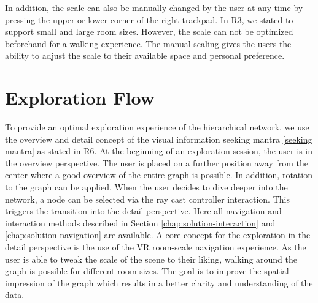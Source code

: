 In addition, the scale can also be manually changed by the user at any time by pressing the upper or lower corner of the right trackpad. 
In \hyperref[req:R3]{R3}, we stated to support small and large room sizes.  However, the scale can not be optimized beforehand for a walking experience. The manual scaling gives the users the ability to adjust the scale to their available space and personal preference.
\section{Exploration Flow}
\label{chap:ps-explorationFlow}
To provide an optimal exploration experience of the hierarchical network, we use the overview and detail concept of the visual information seeking mantra \ref{seeking mantra} as stated in \hyperref[req:R6]{R6}. 
At the beginning of an exploration session, the user is in the overview perspective. The user is placed on a further position away from the center where a good overview of the entire graph is possible. In addition, rotation to the graph can be applied.
When the user decides to dive deeper into the network, a node can be selected via the ray cast controller interaction. This triggers the transition into the detail perspective. 
Here all navigation and interaction methods described in Section \ref{chap:solution-interaction} and \ref{chap:solution-navigation}
are available. 
A core concept for the exploration in the detail perspective is the use of the VR room-scale navigation experience. As the user is able to tweak the scale of the scene to their liking, walking around the graph is possible for different room sizes. The goal is to improve the spatial impression of the graph which results in a better clarity and understanding of the data.

